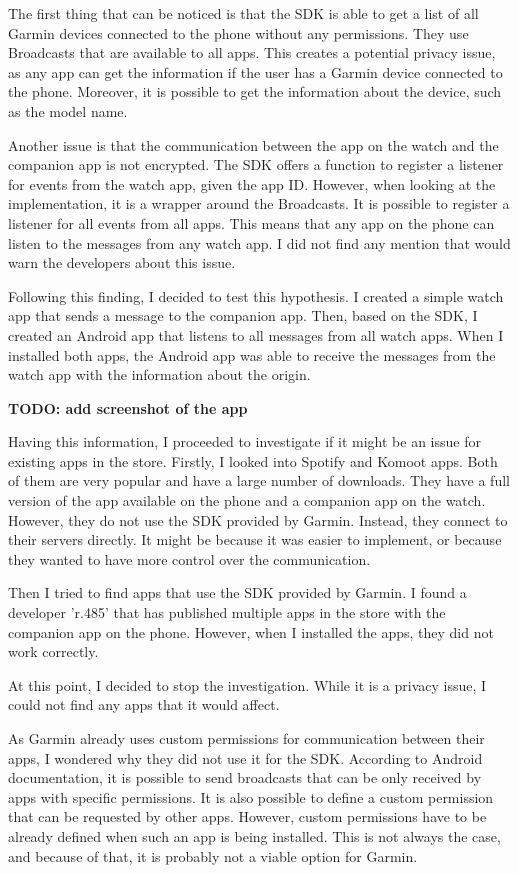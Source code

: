 The first thing that can be noticed is that the SDK is able to get a list of all Garmin devices connected to the phone without any permissions.
They use Broadcasts that are available to all apps.
This creates a potential privacy issue, as any app can get the information if the user has a Garmin device connected to the phone.
Moreover, it is possible to get the information about the device, such as the model name.

Another issue is that the communication between the app on the watch and the companion app is not encrypted.
The SDK offers a function to register a listener for events from the watch app, given the app ID\@.
However, when looking at the implementation, it is a wrapper around the Broadcasts.
It is possible to register a listener for all events from all apps.
This means that any app on the phone can listen to the messages from any watch app.
I did not find any mention that would warn the developers about this issue.

Following this finding, I decided to test this hypothesis.
I created a simple watch app that sends a message to the companion app.
Then, based on the SDK, I created an Android app that listens to all messages from all watch apps.
When I installed both apps, the Android app was able to receive the messages from the watch app with the information about the origin.

\textbf{TODO: add screenshot of the app}

Having this information, I proceeded to investigate if it might be an issue for existing apps in the store.
Firstly, I looked into Spotify and Komoot apps.
Both of them are very popular and have a large number of downloads.
They have a full version of the app available on the phone and a companion app on the watch.
However, they do not use the SDK provided by Garmin.
Instead, they connect to their servers directly.
It might be because it was easier to implement, or because they wanted to have more control over the communication.

Then I tried to find apps that use the SDK provided by Garmin.
I found a developer 'r.485' that has published multiple apps in the store with the companion app on the phone.
However, when I installed the apps, they did not work correctly.

At this point, I decided to stop the investigation.
While it is a privacy issue, I could not find any apps that it would affect.


As Garmin already uses custom permissions for communication between their apps, I wondered why they did not use it for the SDK\@.
According to Android documentation,\cite{android-broadcasts} it is possible to send broadcasts that can be only received by apps with specific permissions.
It is also possible to define a custom permission that can be requested by other apps.
However, custom permissions have to be already defined when such an app is being installed.
This is not always the case, and because of that, it is probably not a viable option for Garmin.
